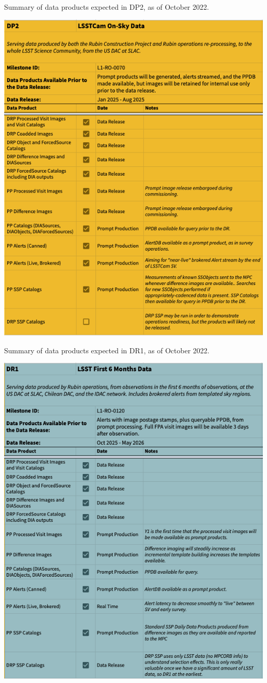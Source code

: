 \begin{table}
\caption{Summary of data products expected in DP2, as of October 2022.}
\label{tab:dp-two-products}
\includegraphics[width=\linewidth]{figures/DP2-products}
\end{table}

\begin{table}
\caption{Summary of data products expected in DR1, as of October 2022.}
\label{tab:dr-one-products}
\includegraphics[width=\linewidth]{figures/DR1-products}
\end{table}
